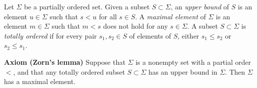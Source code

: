 \documentclass{ctexart}
\begin{document}
\cite[p.25-26]{reid1995undergraduate}Let $\Sigma$ be a partially ordered set. Given a subset $S\subset \Sigma$, an \textit{upper bound} of $S$ is an element $u\in\Sigma$ such that $s<u$ for all $s\in S$. A \textit{maximal element} of $\Sigma$ is an element $m\in \Sigma$ such that $m<s$ does not hold for any $s\in\Sigma$. A subset $S\subset\Sigma$ is \textit{totally ordered} if for every pair $s_1,s_2\in S$ of elements of $S$, either $s_1\leq s_2$ or $s_2\leq s_1$.

\textbf{Axiom (Zorn's lemma)} Suppose that $\Sigma$ is a nonempty set with a partial order $<$, and that any totally ordered subset $S\subset\Sigma$ has an upper bound in $\Sigma$. Then $\Sigma$ has a maximal element.

\newpage
\printbibliography
\end{document}
